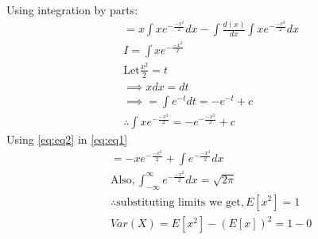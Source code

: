 \documentclass[journal,12pt,twocolumn]{IEEEtran}
\theoremstyle{remark}
\numberwithin{equation}{section}
\begin{document}
  Using integration by parts:
  \begin{align}
   \label{eq:eq1}
 & =x\int xe^{-\frac{-x^2}{2}} dx-\int\frac{d(x)}{dx} \int xe^{-\frac{-x^2}{2}}dx\\
 &I=\int x e^{-\frac{-x^2}{2}}\\
 &\text{Let} \frac{x^2}{2}=t \\
 &\implies x dx=dt\\
 &\implies =\int e^{-t} dt=-e^{-t} +c\\
 \label{eq:eq2}
 &\therefore \int x e^{-\frac{-x^2}{2}}=-e^{-\frac{-x^2}{2}} +c
 \end{align}
 Using \eqref{eq:eq2} in \eqref{eq:eq1}\
 \begin{align}
&= -x e^{-\frac{-x^2}{2}}+\int e^{-\frac{-x^2}{2}} dx\\
&\text{Also} ,\int_{-\infty}^{\infty} e^{-\frac{-x^2}{2}} dx=\sqrt{2 \pi} \\
&\therefore \text{substituting limits we get}, E[x^2]=1\\
 &Var(X)=E[x^2]-(E[x])^2=1-0
 \end{align}
\end{document}
